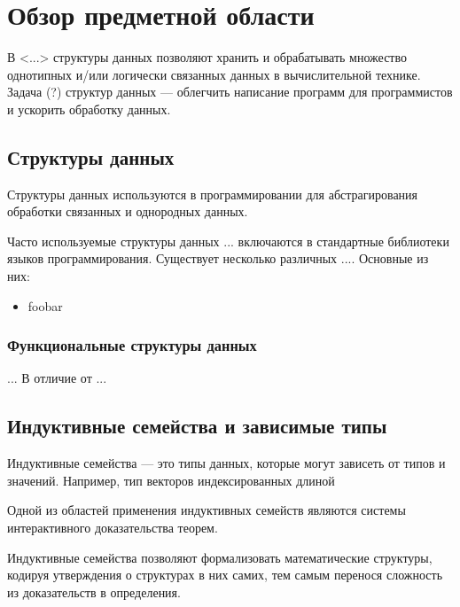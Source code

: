 \chapter{Обзор предметной области}
\label{chapter1}

В <...> структуры данных позволяют хранить и обрабатывать множество однотипных 
и/или логически связанных данных в вычислительной технике.
Задача (?) структур данных — облегчить написание программ для программистов и
ускорить обработку данных.

\section{Структуры данных}
Структуры данных используются в программировании для абстрагирования
обработки связанных и однородных данных.


Часто используемые структуры данных ... включаются в стандартные библиотеки
языков программирования.
Существует несколько различных .... Основные из них:
\begin{itemize}
 \item foobar
\end{itemize}

\subsection{Функциональные структуры данных}
...
В отличие от ...



\section{Индуктивные семейства и зависимые типы}

Индуктивные семейства — это типы данных, которые могут зависеть от типов и значений. Например, тип векторов индексированных длиной 



Одной из областей применения индуктивных семейств являются системы интерактивного
доказательства теорем.

Индуктивные семейства позволяют формализовать математические структуры,
кодируя утверждения о структурах в них самих, тем самым перенося сложность из
доказательств в определения.

